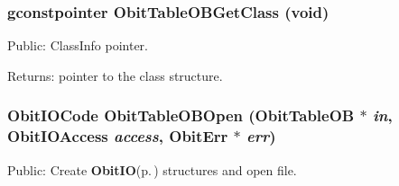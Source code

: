\subsubsection{\setlength{\rightskip}{0pt plus 5cm}gconstpointer Obit\-Table\-OBGet\-Class (void)}\label{ObitTableOB_8h_a13}


Public: Class\-Info pointer. 

\begin{Desc}
\item[Returns:]pointer to the class structure. \end{Desc}
\subsubsection{\setlength{\rightskip}{0pt plus 5cm}Obit\-IOCode Obit\-Table\-OBOpen ({\bf Obit\-Table\-OB} $\ast$ {\em in}, Obit\-IOAccess {\em access}, {\bf Obit\-Err} $\ast$ {\em err})}\label{ObitTableOB_8h_a17}


Public: Create {\bf Obit\-IO}{\rm (p.\,\pageref{structObitIO})} structures and open file. 

